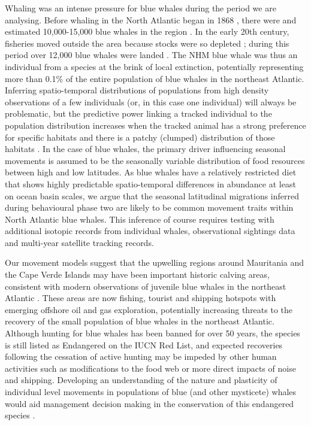 \documentclass[a4paper,12pt]{article}
\begin{document}
Whaling was an intense pressure for blue whales during the period we are
analysing. 
Before whaling in the North Atlantic began in 1868 \cite{reilly2008balaenoptera}, there were and estimated 10,000-15,000 blue whales in the region \cite{sigurjonsson1995life}. 
In the early 20th century, fisheries moved outside the area because stocks were so depleted \cite{reilly2008balaenoptera}; during this period over 12,000 blue whales were landed \cite{sigurjonsson1995life}. 
The NHM blue whale was thus an individual from a species at the brink of local extinction, potentially representing more than 0.1\% of the entire population of blue whales in the northeast Atlantic.
Inferring spatio-temporal distributions of populations from high density observations of a few individuals (or, in this case one individual) will always be problematic, but the predictive power linking a tracked individual to the population distribution increases when the tracked animal has a strong preference for specific habitats and there is a patchy (clumped) distribution of those habitats \cite{holdo2013inferring}. 
In the case of blue whales, the primary driver influencing seasonal movements is assumed to be the seasonally variable distribution of food resources between high and low latitudes. 
As blue whales have a relatively restricted diet that shows highly predictable spatio-temporal differences in abundance at least on ocean basin scales, we argue that the seasonal latitudinal migrations inferred during behavioural phase two are likely to be common movement traits within North Atlantic blue whales. 
This inference of course requires testing with additional isotopic records from individual whales, observational sightings data and multi-year satellite tracking records.

Our movement models suggest that the upwelling regions around Mauritania and the Cape Verde Islands may have been important historic calving areas, consistent with modern observations of juvenile blue whales in the northeast Atlantic \cite{handbook}.
These areas are now fishing, tourist and shipping hotspots with emerging offshore oil and gas exploration, potentially increasing threats to the recovery of the small population of blue whales in the northeast Atlantic. 
Although hunting for blue whales has been banned for over 50 years, the species is still listed as Endangered on the IUCN Red List, and expected recoveries following the cessation of active hunting may be impeded by other human activities such as modifications to the food web or more direct impacts of noise and shipping.
Developing an understanding of the nature and plasticity of individual level movements in populations of blue (and other mysticete) whales would aid management decision making in the conservation of this endangered species \cite{irvine2017quantifying}.
\end{document}
